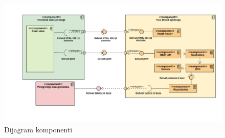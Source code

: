 \begin{figure}[H]
	\centering
	\includegraphics[width=\textwidth, scale=0.5]{dijagrami/dijagram_komponenti}
	\caption{Dijagram komponenti}
	\label{fig:dijagram_komponenti}
\end{figure}
